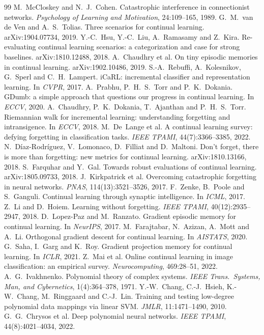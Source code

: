 \documentclass[11pt,a4paper]{article}
\begin{document}
\begin{thebibliography}{99}\small
{} M.~McCloskey and N.~J.~Cohen. Catastrophic interference in connectionist networks. \emph{Psychology of Learning and Motivation}, 24:109--165, 1989.
 G.~M.~van de Ven and A.~S.~Tolias. Three scenarios for continual learning. arXiv:1904.07734, 2019.
 Y.-C.~Hsu, Y.-C.~Liu, A.~Ramasamy and Z.~Kira. Re-evaluating continual learning scenarios: a categorization and case for strong baselines. arXiv:1810.12488, 2018.
 A.~Chaudhry et al. On tiny episodic memories in continual learning. arXiv:1902.10486, 2019.
 S.-A.~Rebuffi, A.~Kolesnikov, G.~Sperl and C.~H.~Lampert. iCaRL: incremental classifier and representation learning. In \emph{CVPR}, 2017.
 A.~Prabhu, P.~H.~S.~Torr and P.~K.~Dokania. GDumb: a simple approach that questions our progress in continual learning. In \emph{ECCV}, 2020.
 A.~Chaudhry, P.~K.~Dokania, T.~Ajanthan and P.~H.~S.~Torr. Riemannian walk for incremental learning: understanding forgetting and intransigence. In \emph{ECCV}, 2018.
 M.~De~Lange et al. A continual learning survey: defying forgetting in classification tasks. \emph{IEEE TPAMI}, 44(7):3366--3385, 2022.
 N.~D\'iaz-Rodr\'iguez, V.~Lomonaco, D.~Filliat and D.~Maltoni. Don't forget, there is more than forgetting: new metrics for continual learning. arXiv:1810.13166, 2018.
 S.~Farquhar and Y.~Gal. Towards robust evaluations of continual learning. arXiv:1805.09733, 2018.
 J.~Kirkpatrick et al. Overcoming catastrophic forgetting in neural networks. \emph{PNAS}, 114(13):3521--3526, 2017.
 F.~Zenke, B.~Poole and S.~Ganguli. Continual learning through synaptic intelligence. In \emph{ICML}, 2017.
 Z.~Li and D.~Hoiem. Learning without forgetting. \emph{IEEE TPAMI}, 40(12):2935--2947, 2018.
 D.~Lopez-Paz and M.~Ranzato. Gradient episodic memory for continual learning. In \emph{NeurIPS}, 2017.
 M.~Farajtabar, N.~Azizan, A.~Mott and A.~Li. Orthogonal gradient descent for continual learning. In \emph{AISTATS}, 2020.
 G.~Saha, I.~Garg and K.~Roy. Gradient projection memory for continual learning. In \emph{ICLR}, 2021.
 Z.~Mai et al. Online continual learning in image classification: an empirical survey. \emph{Neurocomputing}, 469:28--51, 2022.
 A.~G.~Ivakhnenko. Polynomial theory of complex systems. \emph{IEEE Trans.\ Systems, Man, and Cybernetics}, 1(4):364--378, 1971.
 Y.-W.~Chang, C.-J.~Hsieh, K.-W.~Chang, M.~Ringgaard and C.-J.~Lin. Training and testing low-degree polynomial data mappings via linear SVM. \emph{JMLR}, 11:1471--1490, 2010.
 G.~G.~Chrysos et al. Deep polynomial neural networks. \emph{IEEE TPAMI}, 44(8):4021--4034, 2022.
\end{thebibliography}
\end{document}
